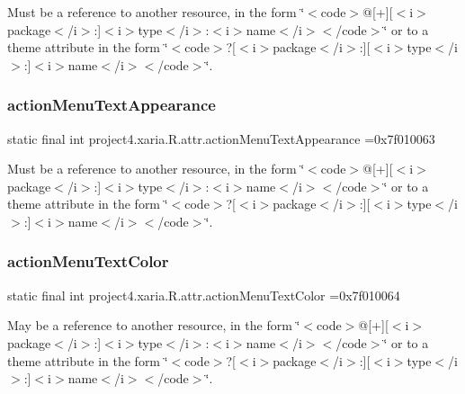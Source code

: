 Must be a reference to another resource, in the form \char`\"{}$<$code$>$@\mbox{[}+\mbox{]}\mbox{[}$<$i$>$package$<$/i$>$\+:\mbox{]}$<$i$>$type$<$/i$>$\+:$<$i$>$name$<$/i$>$$<$/code$>$\char`\"{} or to a theme attribute in the form \char`\"{}$<$code$>$?\mbox{[}$<$i$>$package$<$/i$>$\+:\mbox{]}\mbox{[}$<$i$>$type$<$/i$>$\+:\mbox{]}$<$i$>$name$<$/i$>$$<$/code$>$\char`\"{}. \mbox{\label{classproject4_1_1xaria_1_1R_1_1attr_a2042dc725700b2bfec9ec44ed8af8b0e}} 
\subsubsection{\texorpdfstring{action\+Menu\+Text\+Appearance}{actionMenuTextAppearance}}
{\footnotesize\ttfamily static final int project4.\+xaria.\+R.\+attr.\+action\+Menu\+Text\+Appearance =0x7f010063\hspace{0.3cm}{\ttfamily [static]}}

Must be a reference to another resource, in the form \char`\"{}$<$code$>$@\mbox{[}+\mbox{]}\mbox{[}$<$i$>$package$<$/i$>$\+:\mbox{]}$<$i$>$type$<$/i$>$\+:$<$i$>$name$<$/i$>$$<$/code$>$\char`\"{} or to a theme attribute in the form \char`\"{}$<$code$>$?\mbox{[}$<$i$>$package$<$/i$>$\+:\mbox{]}\mbox{[}$<$i$>$type$<$/i$>$\+:\mbox{]}$<$i$>$name$<$/i$>$$<$/code$>$\char`\"{}. \mbox{\label{classproject4_1_1xaria_1_1R_1_1attr_a3f2c5d23f0952a747d4e812fbe2b1629}} 
\subsubsection{\texorpdfstring{action\+Menu\+Text\+Color}{actionMenuTextColor}}
{\footnotesize\ttfamily static final int project4.\+xaria.\+R.\+attr.\+action\+Menu\+Text\+Color =0x7f010064\hspace{0.3cm}{\ttfamily [static]}}

May be a reference to another resource, in the form \char`\"{}$<$code$>$@\mbox{[}+\mbox{]}\mbox{[}$<$i$>$package$<$/i$>$\+:\mbox{]}$<$i$>$type$<$/i$>$\+:$<$i$>$name$<$/i$>$$<$/code$>$\char`\"{} or to a theme attribute in the form \char`\"{}$<$code$>$?\mbox{[}$<$i$>$package$<$/i$>$\+:\mbox{]}\mbox{[}$<$i$>$type$<$/i$>$\+:\mbox{]}$<$i$>$name$<$/i$>$$<$/code$>$\char`\"{}. 

